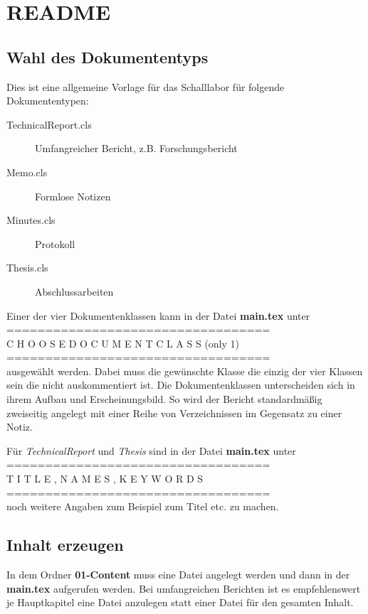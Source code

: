 
\section{README}
\subsection{Wahl des Dokumententyps}
Dies ist eine allgemeine Vorlage für das Schalllabor für folgende Dokumententypen:
\begin{description}
    \item[TechnicalReport.cls] Umfangreicher Bericht, z.B. Forschungsbericht
    \item[Memo.cls] Formlose Notizen
    \item[Minutes.cls] Protokoll
    \item[Thesis.cls] Abschlussarbeiten
\end{description}
Einer der vier Dokumentenklassen kann in der Datei \textbf{main.tex} unter\\
==================================\\
C H O O S E \hspace{2em} D O C U M E N T C L A S S (only 1)\\
==================================\\
ausgewählt werden. 
Dabei muss die gewünschte Klasse die einzig der vier Klassen sein die nicht auskommentiert ist.
Die Dokumentenklassen unterscheiden sich in ihrem Aufbau und Erscheinungsbild. 
So wird der Bericht standardmäßig zweiseitig angelegt mit einer Reihe von Verzeichnissen im Gegensatz zu einer Notiz.
\par 
Für \emph{TechnicalReport} und \emph{Thesis} sind in der Datei \textbf{main.tex} unter \\
==================================\\
T I T L E ,  N A M E S ,  K E Y W O R D S\\
==================================\\
noch weitere Angaben zum Beispiel zum Titel etc. zu machen.

\subsection{Inhalt erzeugen}
In dem Ordner \textbf{01-Content} muss eine Datei angelegt werden und dann in der \textbf{main.tex} aufgerufen werden.
Bei umfangreichen Berichten ist es empfehlenswert je Hauptkapitel eine Datei anzulegen statt einer Datei für den gesamten Inhalt. 

